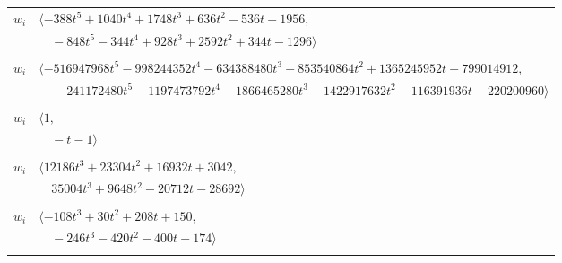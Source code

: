 \documentclass[11pt]{article}
\begin{document}
\begin{longtable}{@{}ll@{}}
$w_i$ & $\langle -388t^{5}+1040t^{4}+1748t^{3}+636t^{2}-536t-1956,$\\
 & $\quad -848t^{5}-344t^{4}+928t^{3}+2592t^{2}+344t-1296\rangle$\\
\addlinespace[2pt]
\multicolumn{2}{@{}p{0.97\textwidth}@{}}{$i=47$, $D_i=262144$, $\rho_{ij}$: $3{:}2, \allowbreak 5{:}1, \allowbreak 8{:}1, \allowbreak 16{:}1, \allowbreak 17{:}1, \allowbreak 18{:}2, \allowbreak 22{:}2, \allowbreak 26{:}1, \allowbreak 27{:}1, \allowbreak 28{:}2, \allowbreak 35{:}1, \allowbreak 36{:}2, \allowbreak 38{:}2, \allowbreak 39{:}2, \allowbreak 42{:}2, \allowbreak 50{:}2, \allowbreak 61{:}1, \allowbreak 62{:}1$}\\
$w_i$ & $\langle -516947968t^{5}-998244352t^{4}-634388480t^{3}+853540864t^{2}+1365245952t+799014912,$\\
 & $\quad -241172480t^{5}-1197473792t^{4}-1866465280t^{3}-1422917632t^{2}-116391936t+220200960\rangle$\\
\addlinespace[2pt]
\multicolumn{2}{@{}p{0.97\textwidth}@{}}{$i=48$, $D_i=1$, $\rho_{ij}$: $6{:}2, \allowbreak 9{:}1, \allowbreak 15{:}2, \allowbreak 51{:}2$}\\
$w_i$ & $\langle 1,$\\
 & $\quad -t-1\rangle$\\
\addlinespace[2pt]
\multicolumn{2}{@{}p{0.97\textwidth}@{}}{$i=49$, $D_i=64$, $\rho_{ij}$: $2{:}2, \allowbreak 4{:}1, \allowbreak 10{:}1, \allowbreak 12{:}2, \allowbreak 17{:}2, \allowbreak 19{:}2, \allowbreak 21{:}2, \allowbreak 25{:}2, \allowbreak 27{:}1, \allowbreak 30{:}2, \allowbreak 40{:}1, \allowbreak 43{:}1, \allowbreak 44{:}1, \allowbreak 45{:}2, \allowbreak 58{:}2, \allowbreak 61{:}2, \allowbreak 62{:}1, \allowbreak 65{:}2, \allowbreak 68{:}1$}\\
$w_i$ & $\langle 12186t^{3}+23304t^{2}+16932t+3042,$\\
 & $\quad 35004t^{3}+9648t^{2}-20712t-28692\rangle$\\
\addlinespace[2pt]
\multicolumn{2}{@{}p{0.97\textwidth}@{}}{$i=50$, $D_i=4$, $\rho_{ij}$: $5{:}1, \allowbreak 9{:}2, \allowbreak 10{:}2, \allowbreak 11{:}1, \allowbreak 16{:}2, \allowbreak 35{:}1, \allowbreak 36{:}1, \allowbreak 39{:}2, \allowbreak 44{:}1, \allowbreak 47{:}1$}\\
$w_i$ & $\langle -108t^{3}+30t^{2}+208t+150,$\\
 & $\quad -246t^{3}-420t^{2}-400t-174\rangle$\\
\addlinespace[2pt]
\multicolumn{2}{@{}p{0.97\textwidth}@{}}{$i=51$, $D_i=8$, $\rho_{ij}$: $14{:}2, \allowbreak 17{:}1, \allowbreak 23{:}2, \allowbreak 34{:}2, \allowbreak 36{:}2, \allowbreak 38{:}2, \allowbreak 40{:}1, \allowbreak 44{:}2, \allowbreak 48{:}1, \allowbreak 66{:}2, \allowbreak 67{:}1, \allowbreak 68{:}2$}\\

\end{longtable}
\end{document}
